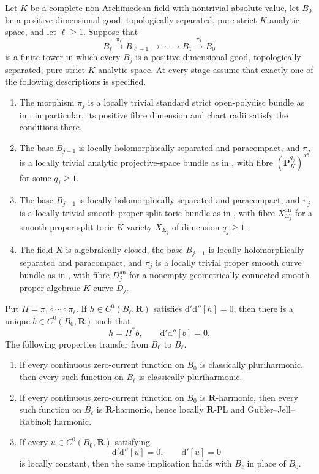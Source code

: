 \begin{proposition}
\label{prop:p062-mixed-exact-bundle-tower-transfer}
Let $K$ be a complete non-Archimedean field with nontrivial absolute
value, let $B_0$ be a positive-dimensional good, topologically separated,
pure strict $K$-analytic space, and let $\ell\geq1$.  Suppose that
\[
 B_\ell\xrightarrow{\pi_\ell}B_{\ell-1}
 \longrightarrow\cdots\longrightarrow B_1
 \xrightarrow{\pi_1}B_0
\]
is a finite tower in which every $B_j$ is a positive-dimensional good,
topologically separated, pure strict $K$-analytic space.  At every stage
assume that exactly one of the following descriptions is specified.
\begin{enumerate}
\item The morphism $\pi_j$ is a locally trivial standard strict
open-polydisc bundle as in
; in particular, its positive
fibre dimension and chart radii satisfy the conditions there.
\item The base $B_{j-1}$ is locally holomorphically separated and
paracompact, and $\pi_j$ is a locally trivial analytic projective-space
bundle as in , with fibre
$(\mathbf P_K^{q_j})^{\mathrm{an}}$ for some $q_j\geq1$.
\item The base $B_{j-1}$ is locally holomorphically separated and
paracompact, and $\pi_j$ is a locally trivial smooth proper split-toric
bundle as in
, with fibre
$X_{\Sigma_j}^{\mathrm{an}}$ for a smooth proper split toric $K$-variety
$X_{\Sigma_j}$ of dimension $q_j\geq1$.
\item The field $K$ is algebraically closed, the base $B_{j-1}$ is locally
holomorphically separated and paracompact, and $\pi_j$ is a locally trivial
proper smooth curve bundle as in
, with fibre
$D_j^{\mathrm{an}}$ for a nonempty geometrically connected smooth proper
algebraic $K$-curve $D_j$.
\end{enumerate}
Put $\Pi=\pi_1\circ\cdots\circ\pi_\ell$.  If
$h\in C^0(B_\ell,\mathbf R)$ satisfies
$\mathrm d'\mathrm d''[h]=0$, then there is a unique
$b\in C^0(B_0,\mathbf R)$ such that
\[
                  h=\Pi^*b,
                  \qquad \mathrm d'\mathrm d''[b]=0.
\]
The following properties transfer from $B_0$ to $B_\ell$.
\begin{enumerate}
\item If every continuous zero-current function on $B_0$ is classically
pluriharmonic, then every such function on $B_\ell$ is classically
pluriharmonic.
\item If every continuous zero-current function on $B_0$ is
$\mathbf R$-harmonic, then every such function on $B_\ell$ is
$\mathbf R$-harmonic, hence locally $\mathbf R$-PL and
Gubler--Jell--Rabinoff harmonic.
\item If every $u\in C^0(B_0,\mathbf R)$ satisfying
\[
             \mathrm d'\mathrm d''[u]=0,
             \qquad \mathrm d'[u]=0
\]
is locally constant, then the same implication holds with $B_\ell$ in
place of $B_0$.
\end{enumerate}
\end{proposition}
